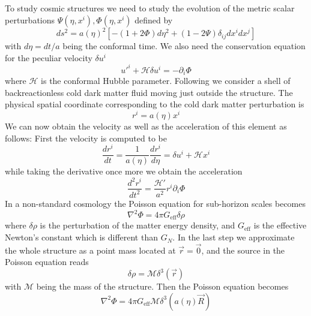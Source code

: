 To study cosmic structures we need to study the evolution of the metric scalar perturbations $\Psi(\eta,x^i), \Phi(\eta,x^i)$ defined by \cite{dePutter:2010vy,Albarran:2016mdu,Panotopoulos}
\begin{equation}
ds^2 = a(\eta)^2 [-(1+2 \Phi) d\eta^2 + (1-2 \Psi) \delta_{i j} dx^i dx^j]
\end{equation}
with $d\eta=dt/a$ being the conformal time. We also need the conservation equation for the peculiar velocity $\delta u^i$ \cite{dePutter:2010vy,Albarran:2016mdu,Panotopoulos}
\begin{equation}
u'^i + \mathcal{H} \delta u^i = - \partial_i \Phi
\end{equation}
where $\mathcal{H}$ is the conformal Hubble parameter.
Following \cite{kousvos} we consider a shell of backreactionless 
cold dark matter fluid moving just outside the structure. The physical spatial coordinate corresponding to the cold dark matter perturbation is 
\begin{equation}
r^i = a(\eta) x^i
\end{equation}
We can now obtain the velocity as well as the acceleration of this element as follows:
First the velocity is computed to be 
\begin{equation}
\frac{d r^i}{d t} = \frac{1}{a(\eta)} \frac{d r^i}{d \eta} = \delta u^i + \mathcal{H} x^i
\end{equation}
while taking the derivative once more we obtain the acceleration 
\begin{equation}
\frac{d^2 r^i}{d t^2} = \frac{\mathcal{H}'}{a^2} r^i \partial_i \Phi
\end{equation}
In a non-standard cosmology the Poisson equation for sub-horizon scales becomes \cite{kousvos}
\begin{equation}
\nabla^2{\Phi} = 4 \pi G_{\text{eff}} \delta \rho
\end{equation}
where $\delta \rho$ is the perturbation of the matter energy density, and $G_{\text{eff}}$ is the effective Newton's constant which is different than $G_N$. In the last step we approximate the whole structure as a point mass located at $\vec{r}=\vec{0}$, and the source in the Poisson equation reads
\begin{equation}
\delta \rho = \mathcal{M} \delta^{3} (\vec{r})
\end{equation}
with $\mathcal{M}$ being the mass of the structure. Then the Poisson equation becomes
\begin{equation}
\nabla^2{\Phi} = 4 \pi G_{\text{eff}} \mathcal{M} \delta^{3} (a(\eta) \vec{R})
\end{equation}
